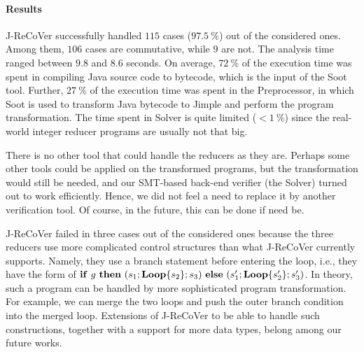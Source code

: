 \documentclass{llncs}
\newcommand{\ite}[3]{
	 \ifmmode
	 \mathbf{if}\ #1 \ \mathbf{then}\ #2\  \mathbf{else}\ #3
	 \else
	 \textbf{if}\ #1 \ \textbf{then}\ #2\  \textbf{else}\ #3
	 \fi}
\newcommand{\rloop}{
	\ifmmode
	\mathbf{Loop}
	\else
	\textbf{Loop}
	\fi}
\begin{document}
\paragraph*{Results} 

J-ReCoVer successfully handled $115$ cases ($97.5~\%$) out of the considered
ones. Among them, $106$ cases are commutative, while $9$ are not. The analysis time ranged between $9.8$ and $8.6$ seconds. On average,
$72~\%$ of the execution time was spent in compiling Java source code to
bytecode, which is the input of the Soot tool. Further, $27~\%$ of the execution
time was spent in the Preprocessor, in which Soot is used to transform Java
bytecode to Jimple and perform the program transformation. The time spent in
Solver is quite limited ($<1~\%$) since the real-world integer reducer programs
are usually not that big. 

There is no other tool that could handle the reducers as they are. Perhaps some
other tools could be applied on the transformed programs, but the
transformation would still be needed, and our SMT-based back-end verifier (the
Solver) turned out to work efficiently. Hence, we did not feel a need to replace
it by another verification tool. Of course, in the future, this can be done if
need be.

J-ReCoVer failed in three cases out of the considered ones because the three
reducers use more complicated control structures than what J-ReCoVer currently
supports. Namely, they use a branch statement before entering the loop, i.e.,
they have the form of
$\ite{g}{(s_1;\rloop\{s_2\};s_3)}{(s'_1;\rloop\{s'_2\};s'_3)}$. In theory, such
a program can be handled by more sophisticated program transformation. For
example, we can merge the two loops and push the outer branch condition into the
merged loop. Extensions of J-ReCoVer to be able to handle such constructions,
together with a support for more data types, belong among our future works.

\end{document}
